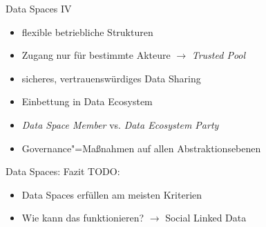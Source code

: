 \begin{frame}{Data Spaces IV \footnotesize\cite{mollerIndustrialDataEcosystems2024}}
    \begin{itemize}
        \item flexible betriebliche Strukturen
        \item Zugang nur für bestimmte Akteure $\to$ \emph{Trusted Pool}
        \item sicheres, vertrauenswürdiges Data Sharing
        \item Einbettung in Data Ecosystem
        \item \emph{Data Space Member} vs. \emph{Data Ecosystem Party}
        \item Governance"=Maßnahmen auf allen Abstraktionsebenen
    \end{itemize}
\end{frame}


\begin{frame}{Data Spaces: Fazit}
    TODO: 
    \begin{itemize}
        \item Data Spaces erfüllen am meisten Kriterien
        \item Wie kann das funktionieren? $\to$ Social Linked Data
    \end{itemize}
\end{frame}
